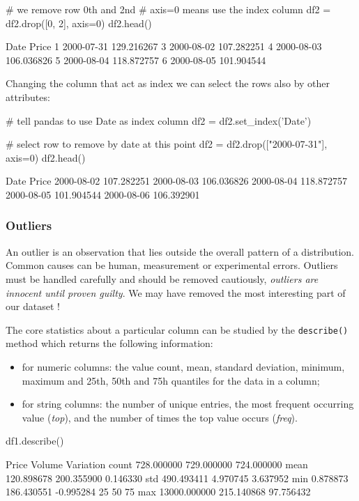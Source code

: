 \begin{ipython}
# we remove row 0th and 2nd
# axis=0 means use the index column
df2 = df2.drop([0, 2], axis=0)
df2.head()
\end{ipython}
\begin{ioutput}
         Date       Price
1  2000-07-31  129.216267
3  2000-08-02  107.282251
4  2000-08-03  106.036826
5  2000-08-04  118.872757
6  2000-08-05  101.904544
\end{ioutput}
        
Changing the column that act as index we can select the rows also by other attributes:

\begin{ipython}
# tell pandas to use Date as index column
df2 = df2.set_index('Date')

# select row to remove by date at this point
df2 = df2.drop(["2000-07-31"], axis=0)
df2.head()
\end{ipython}
\begin{ioutput}
Date        Price
2000-08-02  107.282251
2000-08-03  106.036826
2000-08-04  118.872757
2000-08-05  101.904544
2000-08-06  106.392901
\end{ioutput}
        
\subsubsection{Outliers}\label{outliers}

An outlier is an observation that lies outside the overall pattern of a distribution. 
Common causes can be human, measurement or experimental errors. Outliers must be handled carefully and should be removed cautiously, \emph{outliers are innocent until proven guilty}. We may have removed the most interesting part of our dataset !

The core statistics about a particular column can be studied by the \texttt{describe()} method which returns the following information:
\begin{itemize}
	\tightlist
\item for numeric columns: the value count, mean, standard deviation, minimum, maximum and 25th, 50th and 75h quantiles for the data in a column;
\item for string columns: the number of unique entries, the most frequent occurring value (\emph{top}), and the number of times the top value occurs (\emph{freq}).
\end{itemize}

\begin{ipython}
df1.describe()
\end{ipython}
\begin{ioutput}
              Price      Volume   Variation
count    728.000000  729.000000  724.000000
mean     120.898678  200.355900    0.146330
std      490.493411    4.970745    3.637952
min        0.878873  186.430551   -0.995284
25%
50%
75%
max    13000.000000  215.140868   97.756432
\end{ioutput}
        
